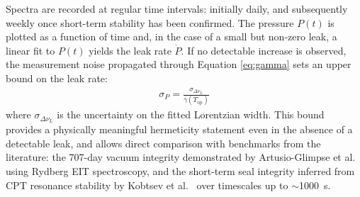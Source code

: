 Spectra are recorded at regular time intervals: initially 
daily, and subsequently weekly once short-term stability 
has been confirmed. The pressure $P(t)$ is plotted as a 
function of time and, in the case of a small but non-zero 
leak, a linear fit to $P(t)$ yields the leak rate 
$\dot{P}$. If no detectable increase is observed, the 
measurement noise propagated through Equation \ref{eq:gamma} sets 
an upper bound on the leak rate:
\begin{align}
    \sigma_P = \frac{\sigma_{\Delta\nu_L}}
    {\gamma(T_\mathrm{op})}
\end{align}
where $\sigma_{\Delta\nu_L}$ is the uncertainty on the 
fitted Lorentzian width. This bound provides a 
physically meaningful hermeticity statement even in the 
absence of a detectable leak, and allows direct 
comparison with benchmarks from the literature: the 
707-day vacuum integrity demonstrated by 
Artusio-Glimpse et al.~\cite{art2025} using Rydberg 
EIT spectroscopy, and the short-term seal integrity 
inferred from CPT resonance stability by Kobtsev et 
al.~\cite{kobtsev2019} over timescales up to 
$\sim$\SI{1000}{\second}.
